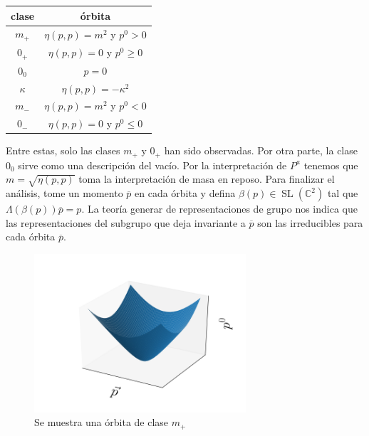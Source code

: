 \documentclass[11pt]{article}
\DeclareMathOperator{\Sl}{SL}
\begin{document}
\begin{center}
\begin{tabular}{|c|c|}
\hline
clase & órbita \\
\hline
$m_+$ & $\eta(p,p)=m^2$ y $p^0>0$ \\
$0_+$ & $\eta(p,p)=0$ y $p^0\geq 0 $ \\
$0_0$ & $p=0$ \\
$\kappa$ & $\eta(p,p)=-\kappa^2$ \\
$m_-$ & $\eta(p,p)=m^2$ y $p^0<0$ \\
$0_-$ & $\eta(p,p)=0$ y $p^0\leq 0$ \\
\hline
\end{tabular}
\end{center}
Entre estas, solo las clases $m_+$ y $0_+$ han sido observadas. Por otra parte, la clase $0_0$ sirve como una descripción del vacío. Por la interpretación de $P^a$ tenemos que $m=\sqrt{\eta(p,p)}$ toma la interpretación de masa en reposo. Para finalizar el análisis, tome un momento $\overline{p}$ en cada órbita y defina $\beta(p)\in\Sl(\mathbb{C}^2)$ tal que $\Lambda(\beta(p))\overline{p}=p$. La teoría generar de representaciones de grupo nos indica que las representaciones del subgrupo que deja invariante a $\overline{p}$ son las irreducibles para cada órbita $\overline{p}$. 

\begin{figure}
\centering
\includegraphics[width=0.7\textwidth]{hiperboloide.png}
\caption{Se muestra una órbita de clase $m_+$}
\end{figure}
\end{document}
